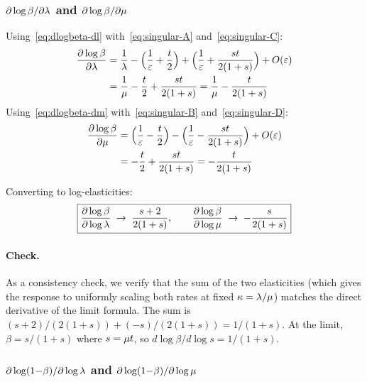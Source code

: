 \subsubsection{\texorpdfstring{$\partial\log\beta/\partial\lambda$ and
$\partial\log\beta/\partial\mu$}{partial log beta / partial lambda and partial log beta / partial mu}}

Using~\eqref{eq:dlogbeta-dl} with~\eqref{eq:singular-A}
and~\eqref{eq:singular-C}:
\begin{align*}
\frac{\partial\log\beta}{\partial\lambda}
  &= \frac{1}{\lambda}
     - \Bigl(\frac{1}{\varepsilon} + \frac{t}{2}\Bigr)
     + \Bigl(\frac{1}{\varepsilon} + \frac{st}{2(1+s)}\Bigr)
     + O(\varepsilon)
\\
  &= \frac{1}{\mu} - \frac{t}{2} + \frac{st}{2(1+s)}
   = \frac{1}{\mu} - \frac{t}{2(1+s)}
\end{align*}
Using~\eqref{eq:dlogbeta-dm} with~\eqref{eq:singular-B}
and~\eqref{eq:singular-D}:
\begin{align*}
\frac{\partial\log\beta}{\partial\mu}
  &= \Bigl(\frac{1}{\varepsilon} - \frac{t}{2}\Bigr)
     - \Bigl(\frac{1}{\varepsilon} - \frac{st}{2(1+s)}\Bigr)
     + O(\varepsilon)
\\
  &= -\frac{t}{2} + \frac{st}{2(1+s)}
   = -\frac{t}{2(1+s)}
\end{align*}

Converting to log-elasticities:
\begin{equation}
\boxed{
\frac{\partial\log\beta}{\partial\log\lambda}
  \;\to\; \frac{s+2}{2(1+s)},
\qquad
\frac{\partial\log\beta}{\partial\log\mu}
  \;\to\; -\frac{s}{2(1+s)}}
\label{eq:logbeta-elasticity-limit}
\end{equation}

\paragraph{Check.} As a consistency check, we verify that the sum of the
two elasticities (which gives the response to uniformly scaling both
rates at fixed $\kappa = \lambda/\mu$) matches the direct
derivative of the limit formula.
The sum is $(s{+}2)/(2(1{+}s)) + (-s)/(2(1{+}s)) = 1/(1{+}s)$.
At the limit, $\beta = s/(1{+}s)$ where $s = \mu t$,
so $d\log\beta/d\log s = 1/(1{+}s)$.  \checkmark

\subsubsection{\texorpdfstring{$\partial\log(1{-}\beta)/\partial\log\lambda$ and
$\partial\log(1{-}\beta)/\partial\log\mu$}{partial log(1-beta) / partial log lambda and partial log(1-beta) / partial log mu}}

